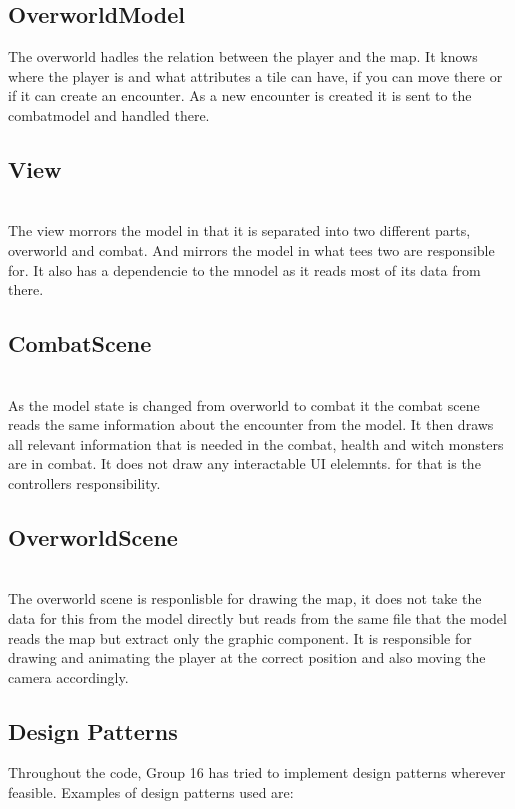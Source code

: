 \subsection{OverworldModel}
\label{overworldmodel}

The overworld hadles the relation between the player and the map. It knows where the player is and what attributes a tile can have, if you can move there or if it can create an encounter. As a new encounter is created it is sent to the combatmodel and handled there.

\subsection{View}
\label{view}

\\The view morrors the model in that it is separated into two different parts, overworld and combat. And mirrors the model in what tees two are responsible for. It also has a dependencie to the mnodel as it reads most of its data from there.

\subsection{CombatScene}
\label{combatscene}

\\As the model state is changed from overworld to combat it the combat scene reads the same information about the encounter from the model. It then draws all relevant information that is needed in the combat, health and witch monsters are in combat. It does not draw any interactable UI elelemnts. for that is the controllers responsibility.
\subsection{OverworldScene}
\label{overworldscene}

\\The overworld scene is responlisble for drawing the map, it does not take the data for this from the model directly but reads from the same file that the model reads the map but extract only the graphic component. It is responsible for drawing and animating the player at the correct position and also moving the camera accordingly.


\subsection{Design Patterns}
Throughout the code, Group 16 has tried to implement design patterns wherever feasible. Examples of design patterns used are:
